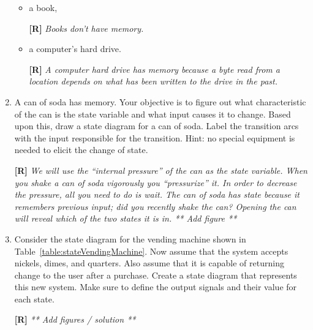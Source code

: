 \begin{enumerate}
\begin{itemize}
    \item a book, 

      \begin{onlysolution}
        \textbf{[R]}
        \itshape
        Books don't have memory.
      \end{onlysolution}

    \item a computer's hard drive.

      \begin{onlysolution}
        \textbf{[R]}
        \itshape
        A computer hard drive has memory because a byte read from a location depends on what has been written to the drive 
        in the past.
      \end{onlysolution}

  \end{itemize}

  \item
    A can of soda has memory. Your objective is to figure out what
    characteristic of the can is the state variable and what input
    causes it to change. Based upon this, draw a state diagram for a can
    of soda. Label the transition arcs with the input responsible for
    the transition. Hint: no special equipment is needed to elicit the
    change of state.

    \begin{onlysolution}
      \textbf{[R]}
      \itshape
      We will use the “internal pressure” of the can as the state variable. When you shake a can of soda vigorously you 
      “pressurize” it. In order to decrease the pressure, all you need to do is wait. The can of soda has state because 
      it remembers previous input; did you recently shake the can? Opening the can will reveal which of the two states 
      it is in.
      ** Add figure **
    \end{onlysolution}

  \item
    Consider the state diagram for the vending machine shown in 
    Table~\ref{table:stateVendingMachine}.
    Now assume that the system accepts nickels, dimes, and
    quarters. Also assume that it is capable of returning change to the
    user after a purchase. Create a state diagram that represents this
    new system. Make sure to define the output signals and their value
    for each state.

    \begin{onlysolution}
      \textbf{[R]}
      \itshape
      ** Add figures / solution ** 
    \end{onlysolution}


\end{enumerate}
